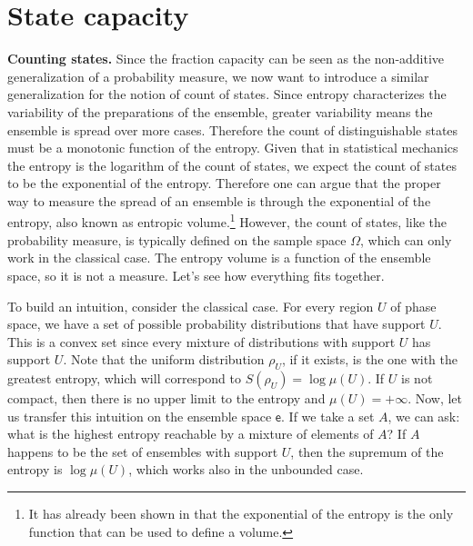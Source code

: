\documentclass[10pt,twocolumn, nofootinbib]{revtex4-2}
\newcommand{\ens}[1][e] {\mathsf{#1}} %
\begin{document}
\section{State capacity}

\textbf{Counting states.} Since the fraction capacity can be seen as the non-additive generalization of a probability measure, we now want to introduce a similar generalization for the notion of count of states. Since entropy characterizes the variability of the preparations of the ensemble, greater variability means the ensemble is spread over more cases. Therefore the count of distinguishable states must be a monotonic function of the entropy. Given that in statistical mechanics the entropy is the logarithm of the count of states, we expect the count of states to be the exponential of the entropy. Therefore one can argue that the proper way to measure the spread of an ensemble is through the exponential of the entropy, also known as entropic volume.\footnote{It has already been shown in \cite{hall1999} that the exponential of the entropy is the only function that can be used to define a volume.} However, the count of states, like the probability measure, is typically defined on the sample space $\Omega$, which can only work in the classical case. The entropy volume is a function of the ensemble space, so it is not a measure. Let's see how everything fits together.

To build an intuition, consider the classical case. For every region $U$ of phase space, we have a set of possible probability distributions that have support $U$. This is a convex set since every mixture of distributions with support $U$ has support $U$. Note that the uniform distribution $\rho_U$, if it exists, is the one with the greatest entropy, which will correspond to $S(\rho_U) = \log \mu(U)$. If $U$ is not compact, then there is no upper limit to the entropy and $\mu(U) = +\infty$. Now, let us transfer this intuition on the ensemble space $\ens$. If we take a set $A$, we can ask: what is the highest entropy reachable by a mixture of elements of $A$? If $A$ happens to be the set of ensembles with support $U$, then the supremum of the entropy is $\log \mu(U)$, which works also in the unbounded case.
\end{document}
